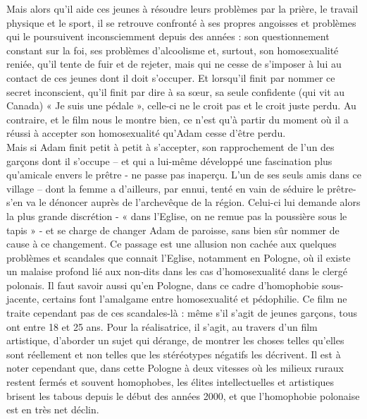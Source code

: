 \documentclass[12pt]{amsart}
\begin{document}
\begin{multicols}{2}
\endgroup

Mais alors qu’il aide ces jeunes à résoudre leurs problèmes par la prière, le travail physique et le sport, il se retrouve confronté à ses propres angoisses et problèmes qui le poursuivent inconsciemment depuis des années : son questionnement constant sur la foi, ses problèmes d’alcoolisme et, surtout, son homosexualité reniée, qu’il tente de fuir et de rejeter, mais qui ne cesse de s’imposer à lui au contact de ces jeunes dont il doit s’occuper. Et lorsqu’il finit par nommer ce secret inconscient, qu’il finit par dire à sa sœur, sa seule confidente (qui vit au Canada) « Je suis une pédale », celle-ci ne le croit pas et le croit juste perdu. Au contraire, et le film nous le montre bien, ce n’est qu’à partir du moment où il a réussi à accepter son homosexualité qu’Adam cesse d’être perdu.\\
 Mais si Adam finit petit à petit à s’accepter, son rapprochement de l’un des garçons dont il s’occupe – et qui a lui-même développé une fascination plus qu’amicale envers le prêtre - ne passe pas inaperçu. L’un de ses seuls amis dans ce village – dont la femme a d’ailleurs, par ennui, tenté en vain de séduire le prêtre- s’en va le dénoncer auprès de l’archevêque de la région. Celui-ci lui demande alors la plus grande discrétion - « dans l’Eglise, on ne remue pas la poussière sous le tapis » - et se charge de changer Adam de paroisse, sans bien sûr nommer de cause à ce changement. Ce passage est une allusion non cachée aux quelques problèmes et scandales que connait l’Eglise, notamment en Pologne, où il existe un malaise profond lié aux non-dits dans les cas d'homosexualité dans le clergé polonais. Il faut savoir aussi qu’en Pologne, dans ce cadre d’homophobie sous-jacente, certains font l’amalgame entre homosexualité et pédophilie. Ce film ne traite cependant pas de ces scandales-là : même s’il s’agit de jeunes garçons, tous ont entre 18 et 25 ans. Pour la réalisatrice, il s’agit, au travers d’un film artistique, d’aborder un sujet qui dérange, de montrer les choses telles qu’elles sont réellement et non telles que les stéréotypes négatifs les décrivent. Il est à noter cependant que, dans cette Pologne à deux vitesses où les milieux ruraux restent fermés et souvent homophobes, les élites intellectuelles et artistiques brisent les tabous depuis le début des années 2000, et que l'homophobie polonaise est en très net déclin.
\\ \\

\end{multicols}
\end{document}
